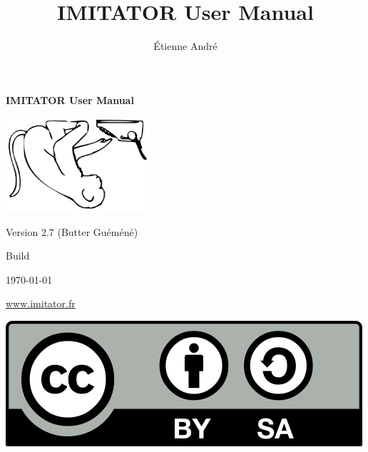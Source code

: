 \documentclass[a4paper,11pt]{report}
\title{IMITATOR User Manual}
\author{Étienne André}
\newcommand{\imitatorversion}{2.7}
\newcommand{\imitatorversionname}{Butter Guéméné}
\begin{document}

\sloppy


\thispagestyle{empty}

\mbox{}

\vspace{3cm}

\begin{center}
	{\Huge \bfseries IMITATOR User Manual}

	\vspace{2cm}

	\includegraphics[width=0.40\textwidth]{include/logo.jpg}

	\vspace{2cm}
	
	{\Large Version \imitatorversion{} (\imitatorversionname{})}
	
\end{center}

\vspace{3cm}

{\small \hfill{}Build }

{\small \hfill{}\today{}}

\vspace{2cm}

\begin{center}
 	{\Large \url{www.imitator.fr}}
 	
\end{center}
\hfill\includegraphics[width=.15\textwidth]{images/CC-BY-SA_500.png}




\newpage

\tableofcontents
{}
\end{document}
